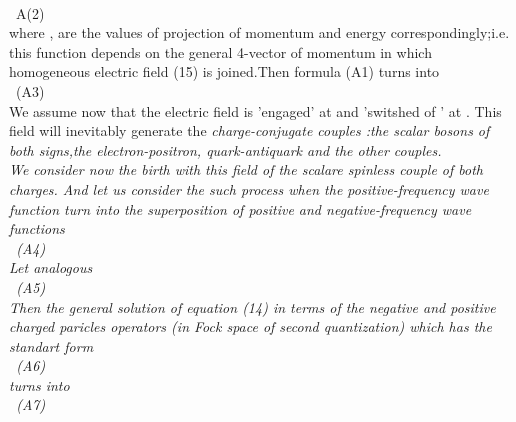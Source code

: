 \documentclass[a4paper,12pt] {article}
\begin{document}
\\\coordHE{}
 \ A(2)
\\ where \coordHE{},\coordHE{} \rm are the values of projection of momentum and energy
 correspondingly;i.e. this function depends on the general 4-vector of momentum in which
homogeneous electric field (15) is joined.Then formula (A1) turns into
\\ \coordHE{} \ (A3) \\ We
assume now that the electric field is 'engaged' at \coordHE{} and  'switshed of ' at \coordHE{}. This
 field will inevitably generate the \it  charge-conjugate \rm  couples :the scalar bosons of both signs,the
 electron-positron, quark-antiquark and the other couples.\\ We consider now the birth with this field of
the \it  scalare spinless couple of both charges. \rm  And let us consider the such process when
 \it the positive-frequency wave function \rm {}\coordHE{}   \it turn into the
superposition of positive and negative-frequency wave functions \rm  \\ \coordHE{} \ (A4)\\
 Let  analogous \\ \coordHE{} \ (A5)
\\ Then the general solution of equation (14) \it  in  terms of the negative and positive charged paricles
operators \rm  (in Fock space of second quantization) which has the standart form
\\\coordHE{} \ (A6)
\\turns  into\\ \coordHE{}\ (A7)
\end{document}

